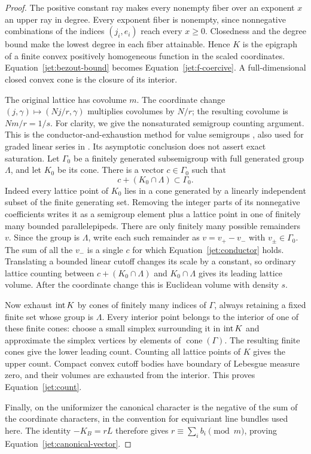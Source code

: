 \begin{proof}
The positive constant ray makes every nonempty fiber over an exponent
$x$ an upper ray in degree. Every exponent fiber is nonempty, since
nonnegative combinations of the indices $(j_i,e_i)$ reach every
$x\ge0$. Closedness and the degree bound make the lowest degree in each
fiber attainable. Hence $K$ is the epigraph of a finite convex
positively homogeneous function in the scaled coordinates.
Equation~\eqref{jet:bezout-bound} becomes
Equation~\eqref{jet:f-coercive}. A full-dimensional closed convex cone
is the closure of its interior.

The original lattice has covolume $m$. The coordinate change
$(j,\gamma)\mapsto(Nj/r,\gamma)$ multiplies covolumes by $N/r$;
the resulting covolume is $Nm/r=1/s$.
For clarity, we give the nonsaturated semigroup counting argument.
This is the conductor-and-exhaustion method for value semigroups
\cite[Theorems~1.4 and~1.6]{KavehKhovanskii2012}, also used for
graded linear series in \cite[Proposition~2.1]{LazarsfeldMustata2009}.
Its asymptotic conclusion does not assert exact saturation.
Let $\Gamma_0$ be a finitely generated subsemigroup with full generated
group $\Lambda$, and let $K_0$ be its cone. There is a vector
$c\in\Gamma_0$ such that
\begin{equation}\label{jet:conductor}
 c+(K_0\cap\Lambda)\subset\Gamma_0.
\end{equation}
Indeed every lattice point of $K_0$ lies in a cone generated by a
linearly independent subset of the finite generating set. Removing the
integer parts of its nonnegative coefficients writes it as a
semigroup element plus a lattice point in one of finitely many bounded
parallelepipeds. There are only finitely many possible remainders $v$.
Since the group is $\Lambda$, write each such remainder as
$v=v_+-v_-$ with $v_\pm\in\Gamma_0$. The sum of all the $v_-$ is a
single $c$ for which Equation~\eqref{jet:conductor} holds. Translating a
bounded linear cutoff changes its scale by a constant, so ordinary
lattice counting between $c+(K_0\cap\Lambda)$ and $K_0\cap\Lambda$
gives its leading lattice volume. After the coordinate change this
is Euclidean volume with density $s$.

Now exhaust $\operatorname{int} K$ by cones of finitely many indices of $\Gamma$,
always retaining a fixed finite set whose group is $\Lambda$.
Every interior point belongs to the interior of one of these finite
cones: choose a small simplex surrounding it in $\operatorname{int} K$ and
approximate the simplex vertices by elements of
$\operatorname{cone}(\Gamma)$. The resulting finite cones give the lower
leading count. Counting all lattice points of $K$ gives the upper
count. Compact convex cutoff bodies have boundary of Lebesgue measure
zero, and their volumes are exhausted from the interior. This proves
Equation~\eqref{jet:count}.

Finally, on the uniformizer the canonical character is the negative of
the sum of the coordinate characters, in the convention for equivariant
line bundles used here. The identity $-K_B=rL$ therefore gives
$r\equiv\sum_i b_i\pmod m$, proving
Equation~\eqref{jet:canonical-vector}.
\end{proof}

